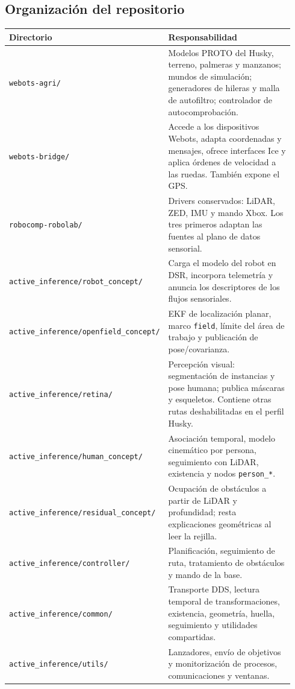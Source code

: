 \documentclass[11pt,a4paper]{article}
\newcommand{\code}[1]{\nolinkurl{#1}}
\newcommand{\file}[1]{\nolinkurl{#1}}
\begin{document}
\subsection{Organización del repositorio}
\begin{longtable}{p{0.27\linewidth}p{0.67\linewidth}}
\toprule
Directorio & Responsabilidad \\
\midrule
\endhead
\file{webots-agri/} & Modelos PROTO del Husky, terreno, palmeras y manzanos; mundos de simulación; generadores de hileras y malla de autofiltro; controlador de autocomprobación. \\
\file{webots-bridge/} & Accede a los dispositivos Webots, adapta coordenadas y mensajes, ofrece interfaces Ice y aplica órdenes de velocidad a las ruedas. También expone el GPS. \\
\file{robocomp-robolab/} & Drivers conservados: LiDAR, ZED, IMU y mando Xbox. Los tres primeros adaptan las fuentes al plano de datos sensorial. \\
\file{active_inference/robot_concept/} & Carga el modelo del robot en DSR, incorpora telemetría y anuncia los descriptores de los flujos sensoriales. \\
\file{active_inference/openfield_concept/} & EKF de localización planar, marco \code{field}, límite del área de trabajo y publicación de pose/covarianza. \\
\file{active_inference/retina/} & Percepción visual: segmentación de instancias y pose humana; publica máscaras y esqueletos. Contiene otras rutas deshabilitadas en el perfil Husky. \\
\file{active_inference/human_concept/} & Asociación temporal, modelo cinemático por persona, seguimiento con LiDAR, existencia y nodos \code{person_*}. \\
\file{active_inference/residual_concept/} & Ocupación de obstáculos a partir de LiDAR y profundidad; resta explicaciones geométricas al leer la rejilla. \\
\file{active_inference/controller/} & Planificación, seguimiento de ruta, tratamiento de obstáculos y mando de la base. \\
\file{active_inference/common/} & Transporte DDS, lectura temporal de transformaciones, existencia, geometría, huella, seguimiento y utilidades compartidas. \\
\file{active_inference/utils/} & Lanzadores, envío de objetivos y monitorización de procesos, comunicaciones y ventanas. \\
\bottomrule
\end{longtable}
\end{document}
